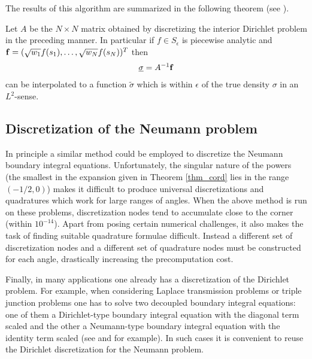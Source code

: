 The results of this algorithm are summarized in the following theorem (see \cite{}).
\begin{theorem}
Let $A$ be the $N\times N$ matrix obtained by discretizing the interior Dirichlet problem in the preceding manner. In particular if $f \in S_\epsilon $ is piecewise analytic and ${\bf f} = (\sqrt{w_1}f(s_1),\dots,\sqrt{w_N}f(s_N))^T$ then
\begin{align}
\underline{\bf \sigma} = A^{-1} {\bf f}
\end{align}
can be interpolated to a function $\tilde{\sigma}$ which is within $\epsilon$ of the true density $\sigma$ in an $L^2$-sense. 
\end{theorem}


\subsection{Discretization of the Neumann problem}
In principle a similar method could be employed to discretize the Neumann boundary integral equations. Unfortunately, the singular nature of the powers (the smallest in the expansion given in Theorem \ref{thm_cord} lies in the range $(-1/2,0)$) makes it difficult to produce universal discretizations and quadratures which work for large ranges of angles. When the above method is run on these problems, discretization nodes tend to accumulate close to the corner (within $10^{-14}$). Apart from posing certain numerical challenges, it also makes the task of finding suitable quadrature formulae difficult. Instead a different set of discretization nodes and a different set of quadrature nodes must be constructed for each angle, drastically increasing the precomputation cost.

Finally, in many applications one already has a discretization of the Dirichlet problem. For example, when considering Laplace transmission problems or triple junction problems one has to solve two decoupled boundary integral equations: one of them a Dirichlet-type boundary integral equation with the diagonal term scaled and the other a Neumann-type boundary integral equation with the identity term scaled (see \cite{} and \cite{} for example). In such cases it is convenient to reuse the Dirichlet discretization for the Neumann problem.  
